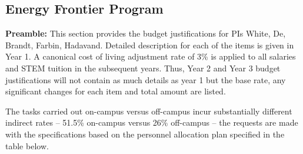\subsection{Energy Frontier Program}
{\bf Preamble:} This section provides the budget justifications for PIs White, De, Brandt, Farbin, Hadavand.  Detailed description for each of the items is given in Year 1.  A canonical cost of living adjustment rate of 3\% is applied to all salaries and STEM tuition in the subsequent years.   Thus, Year 2 and Year 3 budget justifications will not contain as much details as year 1 but the base rate, any significant changes for each item and total amount are listed.

The tasks carried out on-campus versus off-campus incur substantially different indirect rates – 51.5\% on-campus versus 26\% off-campus – the requests are made with the specifications based on the personnel allocation plan specified in the table below.  


